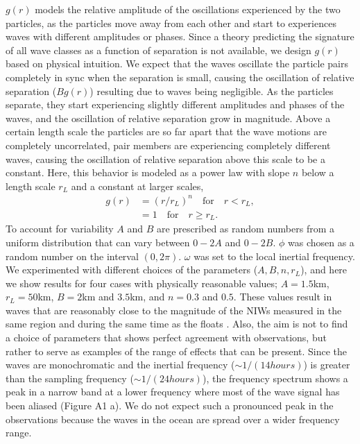 \documentclass[]{ametsoc}
\begin{document}
$g(r)$ models the relative amplitude of the oscillations experienced by the two particles, as the particles move away from each other and start to experiences waves with different amplitudes or phases. Since a theory predicting the signature of all wave classes as a function of separation is not available, we design $g(r)$ based on physical intuition. We expect that the waves oscillate the particle pairs completely in sync when the separation is small, causing the oscillation of relative separation ($B g(r)$) resulting due to waves being negligible. As the particles separate, they start experiencing slightly different amplitudes and phases of the waves, and the oscillation of relative separation grow in magnitude. Above a certain length scale the particles are so far apart that the wave motions are completely uncorrelated, pair members are experiencing completely different waves, causing the oscillation of relative separation above this scale to be a constant. Here, this behavior is modeled as a power law with slope $n$ below a length scale $r_L$ and a constant at larger scales, 
\begin{equation}
    \begin{split}
        g(r) & = (r/r_L)^n \quad \text{for} \quad r<r_L, \\
             & = 1 \quad \text{for} \quad r\geq r_L.
    \end{split}
\end{equation}
To account for variability $A$ and $B$ are prescribed as random numbers from a uniform distribution that can vary between $0-2A$ and $0-2B$. $\phi$ was chosen as a random number on the interval $(0, 2\pi)$. $\omega$ was set to the local inertial frequency. We experimented with different choices of the parameters ($A, B, n, r_L$), and here we show results for four cases with physically reasonable values; $A=1.5$km, $r_L=50$km, $B=2$km and $3.5$km, and $n=0.3$ and $0.5$. These values result in waves that are reasonably close to the magnitude of the NIWs measured in the same region and during the same time as the floats \citep{kilbourne2015quantifying}. Also, the aim is not to find a choice of parameters that shows perfect agreement with observations, but rather to serve as examples of the range of effects that can be present. Since the waves are monochromatic and the inertial frequency ($\sim 1/(14 hours)$) is greater than the sampling frequency ($\sim 1/(24 hours)$), the frequency spectrum shows a peak in a narrow band at a lower frequency where most of the wave signal has been aliased (Figure A1 a). We do not expect such a pronounced peak in the observations because the waves in the ocean are spread over a wider frequency range.
\end{document}
